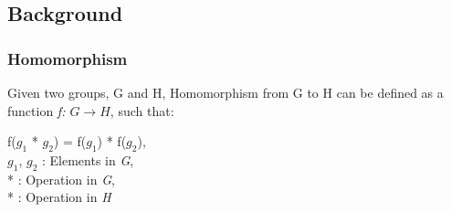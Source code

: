 \subsection{Background}
\label{4_1_1}
\subsubsection*{Homomorphism}
Given two groups, G and H, Homomorphism from G to H can be defined as a function \textit{f: $G \rightarrow H$}, such that:
\begin{adjustwidth}{2cm}{}
f($g_1$ * $g_2$) = f($g_1$) * f($g_2$), \\
$g_1$, $g_2$ : Elements in \textit{G},\\
* : Operation in \textit{G}, \\
* : Operation in \textit{H}
\end{adjustwidth}
